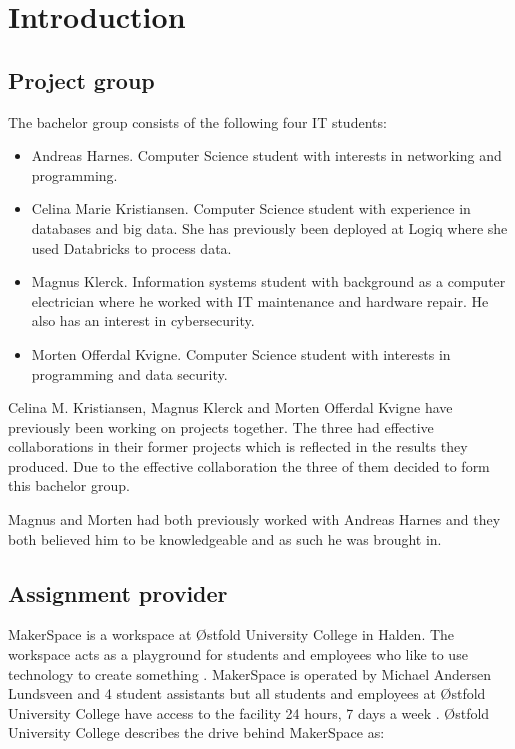 \chapter{Introduction}
\section{Project group}
The bachelor group consists of the following four IT students:
\begin{itemize}
    \item Andreas Harnes. 
    Computer Science student with interests in networking and programming.
    \item Celina Marie Kristiansen.
    Computer Science student with experience in databases and big data.
    She has previously been deployed at Logiq where she used Databricks to process data.
    \item Magnus Klerck.
    Information systems student with background as a computer electrician where he worked with IT maintenance and hardware repair.
    He also has an interest in cybersecurity.
    \item Morten Offerdal Kvigne.
    Computer Science student with interests in programming and data security.
\end{itemize}
Celina M. Kristiansen, Magnus Klerck and Morten Offerdal Kvigne have previously been working on projects together.
The three had effective collaborations in their former projects which is reflected in the results they produced.
Due to the effective collaboration the three of them decided to form this bachelor group.

Magnus and Morten had both previously worked with Andreas Harnes and they both believed him to be knowledgeable and as such he was brought in.

\section{Assignment provider}
MakerSpace is a workspace at Østfold University College in Halden. 
The workspace acts as a playground for students and employees who like to use technology to create something \cite{what-is-makerspace}.
MakerSpace is operated by Michael Andersen Lundsveen and 4 student assistants but all students and employees at Østfold University College have access to the facility 24 hours, 7 days a week
\cite{what-is-makerspace}.
Østfold University College describes the drive behind MakerSpace as:

